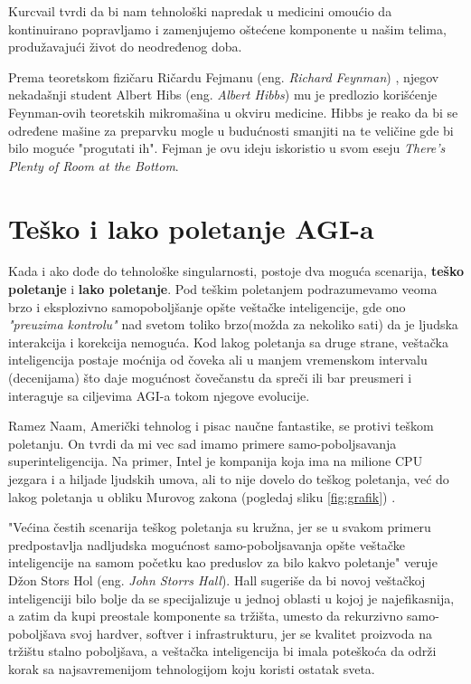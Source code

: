 \documentclass[a4paper]{article}
\begin{document}
Kurcvail tvrdi da bi nam tehnološki napredak u medicini omoućio da kontinuirano popravljamo i zamenjujemo oštećene komponente u našim telima, produžavajući život do neodređenog doba.

Prema teoretskom fizičaru Ričardu Fejmanu (eng. \textit{Richard Feynman}) , njegov nekadašnji student Albert Hibs (eng. \textit{Albert Hibbs}) mu je predlozio korišćenje Feynman-ovih teoretskih mikromašina u okviru medicine. Hibbs je reako da bi se određene mašine za preparvku mogle u budućnosti smanjiti na te veličine gde bi bilo moguće "progutati ih". Fejman je ovu ideju iskoristio u svom eseju \textit{ There's Plenty of Room at the Bottom}\cite{ref17}.

\section{Teško i lako poletanje AGI-a}
\label{sec:poletanje}
Kada i ako dođe do tehnološke singularnosti, postoje dva moguća scenarija, \textbf{teško poletanje} i \textbf {lako poletanje}.
Pod teškim poletanjem podrazumevamo veoma brzo i eksplozivno samopoboljšanje opšte veštačke inteligencije, gde ono \textit{"preuzima kontrolu"} nad svetom toliko brzo(možda za nekoliko sati) da je ljudska interakcija i korekcija nemoguća. Kod lakog poletanja sa druge strane, veštačka inteligencija postaje moćnija od čoveka ali u manjem vremenskom intervalu (decenijama) što daje mogućnost čovečanstu da spreči ili bar preusmeri i interaguje sa ciljevima AGI-a tokom njegove evolucije\cite{ref18}.

Ramez Naam, Američki tehnolog i pisac naučne fantastike, se protivi teškom poletanju. On tvrdi da mi vec sad imamo primere samo-poboljsavanja superinteligencija. Na primer, Intel je kompanija koja ima na milione CPU jezgara i a hiljade ljudskih umova, ali to nije dovelo do teškog poletanja, već do lakog poletanja u obliku Murovog zakona (pogledaj sliku \ref{fig:grafik}) \cite{ref19}.

"Većina čestih scenarija teškog poletanja su kružna, jer se u svakom 
primeru predpostavlja nadljudska mogućnost samo-poboljsavanja opšte veštačke inteligencije na samom početku kao preduslov za bilo kakvo poletanje" veruje Džon Stors Hol (eng. \textit{John Storrs Hall}). Hall sugeriše da bi novoj veštačkoj inteligenciji bilo bolje da se specijalizuje u jednoj oblasti u kojoj je najefikasnija, a zatim da kupi preostale komponente sa tržišta, umesto da rekurzivno samo-poboljšava svoj hardver, softver i infrastrukturu, jer se kvalitet proizvoda na tržištu stalno poboljšava, a veštačka inteligencija bi imala poteškoća da održi korak sa najsavremenijom tehnologijom koju koristi ostatak sveta\cite{ref20}.
\end{document}
